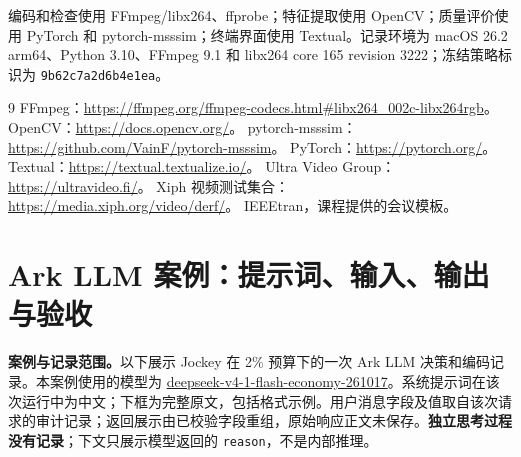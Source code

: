 \documentclass[UTF8,12pt,a4paper,twocolumn]{ctexart}
\begin{document}
编码和检查使用 FFmpeg/libx264、ffprobe；特征提取使用 OpenCV；质量评价使用 PyTorch 和 pytorch-msssim；终端界面使用 Textual。记录环境为 macOS 26.2 arm64、Python 3.10、FFmpeg 9.1 和 libx264 core 165 revision 3222；冻结策略标识为 \texttt{9b62c7a2d6b4e1ea}。
\begin{thebibliography}{9}\footnotesize
{} FFmpeg：\url{https://ffmpeg.org/ffmpeg-codecs.html#libx264_002c-libx264rgb}。
 OpenCV：\url{https://docs.opencv.org/}。
 pytorch-msssim：\url{https://github.com/VainF/pytorch-msssim}。
 PyTorch：\url{https://pytorch.org/}。
 Textual：\url{https://textual.textualize.io/}。
 Ultra Video Group：\url{https://ultravideo.fi/}。
 Xiph 视频测试集合：\url{https://media.xiph.org/video/derf/}。
 IEEEtran，课程提供的会议模板。
\end{thebibliography}

\appendix
\section{Ark LLM 案例：提示词、输入、输出与验收}\label{app:llmcase}
\textbf{案例与记录范围。}以下展示 Jockey 在 2\% 预算下的一次 Ark LLM 决策和编码记录。本案例使用的模型为 \url{deepseek-v4-1-flash-economy-261017}。系统提示词在该次运行中为中文；下框为完整原文，包括格式示例。用户消息字段及值取自该次请求的审计记录；返回展示由已校验字段重组，原始响应正文未保存。\textbf{独立思考过程没有记录}；下文只展示模型返回的 \texttt{reason}，不是内部推理。
\end{document}
